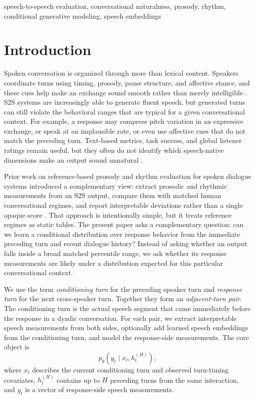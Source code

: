\documentclass[conference]{IEEEtran}
\begin{document}
\begin{IEEEkeywords}
speech-to-speech evaluation, conversational naturalness, prosody, rhythm, conditional generative modeling, speech embeddings
\end{IEEEkeywords}

\section{Introduction}
Spoken conversation is organized through more than lexical content.
Speakers coordinate turns using timing, prosody, pause structure, and affective stance, and these cues help make an exchange sound smooth rather than merely intelligible \cite{riest_anticipation_2015, levinson_turn-taking_2016, koiso_analysis_1998}.
S2S systems are increasingly able to generate fluent speech, but generated turns can still violate the behavioral ranges that are typical for a given conversational context.
For example, a response may compress pitch variation in an expressive exchange, or speak at an implausible rate, or even use affective cues that do not match the preceding turn.
Text-based metrics, task success, and global listener ratings remain useful, but they often do not identify which speech-native dimensions make an output sound unnatural \cite{omahony_combining_2022}.

Prior work on reference-based prosody and rhythm evaluation for spoken dialogue systems introduced a complementary view: extract prosodic and rhythmic measurements from an S2S output, compare them with matched human conversational regimes, and report interpretable deviations rather than a single opaque score \cite{DISTRIB}.
That approach is intentionally simple, but it treats reference regimes as static tables.
The present paper asks a complementary question: can we learn a conditional distribution over response behavior from the immediate preceding turn and recent dialogue history?
Instead of asking whether an output falls inside a broad matched percentile range, we ask whether its response measurements are likely under a distribution expected for this particular conversational context.

We use the term \emph{conditioning turn} for the preceding speaker turn and \emph{response turn} for the next cross-speaker turn.
Together they form an \emph{adjacent-turn pair}.
The conditioning turn is the actual speech segment that came immediately before the response in a dyadic conversation.
For each pair, we extract interpretable speech measurements from both sides, optionally add learned speech embeddings from the conditioning turn, and model the response-side measurements.
The core object is
\begin{equation}
    p_{\theta}(y_t \mid x_t, h_t^{(H)}),
    \label{eq:conditional_distribution}
\end{equation}
where $x_t$ describes the current conditioning turn and observed turn-timing covariates, $h_t^{(H)}$ contains up to $H$ preceding turns from the same interaction, and $y_t$ is a vector of response-side speech measurements.
\end{document}
